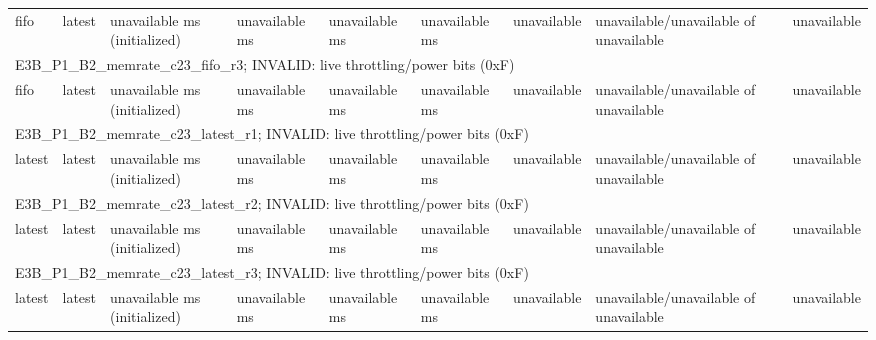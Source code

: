 \begin{tabular}{lllllllll}
fifo & latest & unavailable ms (initialized) & unavailable ms & unavailable ms & unavailable ms & unavailable & unavailable/unavailable of unavailable & unavailable \\
\multicolumn{9}{l}{E3B\_P1\_B2\_memrate\_c23\_fifo\_r3; INVALID: live throttling/power bits (0xF)} \\
fifo & latest & unavailable ms (initialized) & unavailable ms & unavailable ms & unavailable ms & unavailable & unavailable/unavailable of unavailable & unavailable \\
\multicolumn{9}{l}{E3B\_P1\_B2\_memrate\_c23\_latest\_r1; INVALID: live throttling/power bits (0xF)} \\
latest & latest & unavailable ms (initialized) & unavailable ms & unavailable ms & unavailable ms & unavailable & unavailable/unavailable of unavailable & unavailable \\
\multicolumn{9}{l}{E3B\_P1\_B2\_memrate\_c23\_latest\_r2; INVALID: live throttling/power bits (0xF)} \\
latest & latest & unavailable ms (initialized) & unavailable ms & unavailable ms & unavailable ms & unavailable & unavailable/unavailable of unavailable & unavailable \\
\multicolumn{9}{l}{E3B\_P1\_B2\_memrate\_c23\_latest\_r3; INVALID: live throttling/power bits (0xF)} \\
latest & latest & unavailable ms (initialized) & unavailable ms & unavailable ms & unavailable ms & unavailable & unavailable/unavailable of unavailable & unavailable \\
\bottomrule
\end{tabular}
